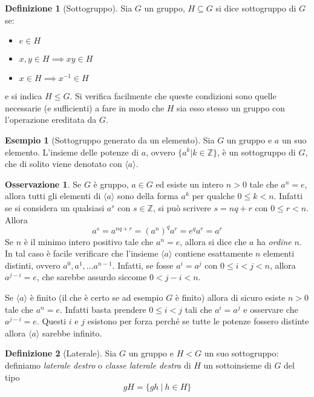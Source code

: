 \documentclass[11pt]{article}
\theoremstyle{plain}
\theoremstyle{definition}
\newtheorem{defn}{Definizione}[section]
\newtheorem{exmp}{Esempio}[section]
\newtheorem*{rem}{Osservazione}
\theoremstyle{remark}
\newcommand{\Z}{\mathbb{Z}}
\begin{document}
\begin{defn}[Sottogruppo]
Sia $G$ un gruppo, $H\subseteq G$ si dice sottogruppo di $G$ se:
\begin{itemize}
	\item $e\in H$
	\item $x,y\in H \implies xy\in H$
	\item $x\in H \implies x^{-1}\in H$
\end{itemize}
e si indica $H \leq G$. Si verifica facilmente che queste condizioni sono quelle necessarie (e sufficienti) a fare in modo che $H$ sia esso stesso un gruppo con l'operazione ereditata da $G$.
\end{defn}

\begin{exmp}[Sottogruppo generato da un elemento]
Sia $G$ un gruppo e $a$ un suo elemento. L'insieme delle potenze di $a$, ovvero $\{a^k | k\in\Z\}$, è un sottogruppo di $G$,
che di solito viene denotato con $\langle a\rangle$.
\end{exmp}

\begin{rem}
Se $G$ è gruppo, $a\in G$ ed esiste un intero $n>0$ tale che $a^n=e$, allora tutti gli elementi di $\langle a\rangle$ sono della forma
$a^k$ per qualche $0\le k < n$. Infatti se si considera un qualsiasi $a^s$ con $s\in\Z$, si può scrivere $s=nq+r$ con $0\le r<n$.
Allora \[a^s=a^{nq+r} = (a^n)^qa^r = e^qa^r = a^r\]
Se $n$ è il minimo intero positivo tale che $a^n=e$, allora si dice che $a$ ha \emph{ordine} $n$. In tal caso è facile verificare che
l'insieme $\langle a\rangle$ contiene esattamente $n$ elementi distinti, ovvero $a^0, a^1, \dots a^{n-1}$.
Infatti, se fosse $a^i=a^j$ con $0\le i<j<n$, allora $a^{j-i}=e$, che sarebbe assurdo siccome $0<j-i<n$.

Se $\langle a\rangle$ è finito (il che è certo se ad esempio $G$ è finito) allora di sicuro esiste $n>0$ tale che $a^n=e$. Infatti basta prendere $0\le i < j$
tali che $a^i = a^j$ e osservare che $a^{j-i} = e$. Questi $i$ e $j$ esistono per forza perché se tutte le potenze fossero distinte allora $\langle a\rangle$ sarebbe infinito.
\end{rem}


\begin{defn}[Laterale]
	Sia $G$ un gruppo e $H<G$ un suo sottogruppo: definiamo \emph{laterale destro} o \emph{classe laterale destra} di $H$
	un sottoinsieme di $G$ del tipo
	\[gH=\{ gh\ |\ h\in H\}\]
\end{defn}
\end{document}

